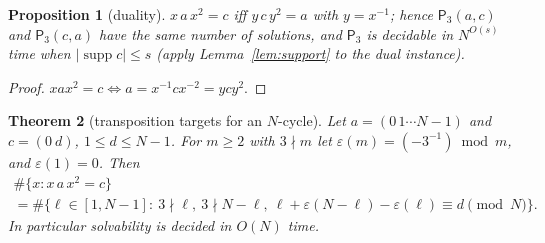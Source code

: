 \documentclass[preprint,12pt]{elsarticle}
\newtheorem{thm}{Theorem}[section]\newtheorem{lem}[thm]{Lemma}\newtheorem{cor}[thm]{Corollary}\newtheorem{prop}[thm]{Proposition}
\theoremstyle{definition}\newtheorem{defi}[thm]{Definition}\newtheorem{prob}[thm]{Problem}\newtheorem{obs}[thm]{Observation}
\theoremstyle{remark}\newtheorem{rem}[thm]{Remark}
\newcommand{\Pthree}{\mathsf{P}_3}\newcommand{\Conj}[1]{\mathsf{Conj}_{#1}}\newcommand{\Dzero}{\Conj{3}}\newcommand{\TR}{T_{\mathcal R}}
\begin{document}
\begin{prop}[duality]\label{prop:dual}
$x\,a\,x^{2}=c$ iff $y\,c\,y^{2}=a$ with $y=x^{-1}$; hence $\Pthree(a,c)$ and $\Pthree(c,a)$ have the same number of solutions, and
$\Pthree$ is decidable in $N^{O(s)}$ time when $|\operatorname{supp}c|\le s$ (apply Lemma~\ref{lem:support} to the dual instance).
\end{prop}
\begin{proof}
$xax^{2}=c\iff a=x^{-1}cx^{-2}=ycy^{2}$.
\end{proof}

\begin{thm}[transposition targets for an $N$-cycle]\label{thm:transposition}
Let $a=(0\,1\cdots N{-}1)$ and $c=(0\ d)$, $1\le d\le N-1$. For $m\ge2$ with $3\nmid m$ let $\varepsilon(m)=(-3^{-1})\bmod m$, and $\varepsilon(1)=0$. Then
\begin{multline*} \#\{x: x\,a\,x^{2}=c\}\\=\#\{\ell\in[1,N-1]:\ 3\nmid\ell,\ 3\nmid N-\ell,\ \ell+\varepsilon(N-\ell)-\varepsilon(\ell)\equiv d\pmod N\}. \end{multline*}
In particular solvability is decided in $O(N)$ time.
\end{thm}
\end{document}
